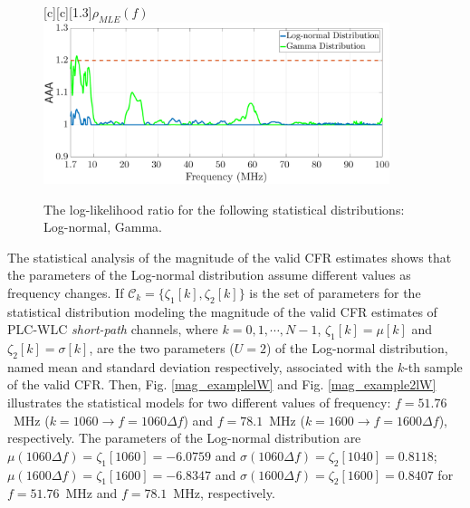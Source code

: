 
\begin{figure}[h!]
	\centering
	[c][1.3]{$\rho_{MLE} (f)$}
	\includegraphics[width=0.9\textwidth]{images/Log_Lognormal_GammalW.eps}
	\caption{The log-likelihood ratio for the following statistical distributions: Log-normal, Gamma.}
	\label{fig:Log_likelW}
\end{figure}


The statistical analysis of the magnitude of the valid \ac{CFR} estimates shows that the parameters of the Log-normal distribution assume different values as frequency changes. If $\mathcal{C}_{k} = \{\zeta_1[k],\zeta_2[k]\}$ is the set of parameters for the statistical distribution modeling the magnitude of the valid \ac{CFR} estimates of \ac{PLC}-\ac{WLC} \textit{short-path} channels, where $k=0,1,\cdots,N-1$,  $\zeta_1[k] = \mu[k]$ and $\zeta_2[k] = \sigma[k]$, are the two parameters ($U=2$) of the Log-normal distribution, named mean and standard deviation respectively, associated with the $k$-th sample of the valid \ac{CFR}. Then, Fig. \ref{mag_examplelW} and Fig. \ref{mag_example2lW} illustrates the statistical models for two different values of frequency: $f=51.76$~MHz ($k=1060 \rightarrow f = 1060\Delta f$) and $f=78.1$~MHz ($k=1600 \rightarrow f = 1600\Delta f$), respectively. The parameters of the Log-normal distribution are  $\mu(1060 \Delta f) = \zeta_1[1060]=-6.0759$ and $\sigma( 1060 \Delta f) = \zeta_2[1040] = 0.8118$; $\mu(1600 \Delta f) = \zeta_1[1600] = -6.8347$ and $\sigma( 1600 \Delta f) = \zeta_2[1600]=0.8407$ for $f=51.76$~MHz and $f=78.1$~MHz, respectively.

